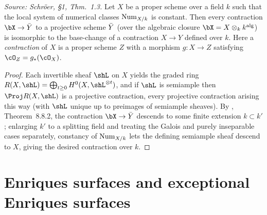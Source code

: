 \begin{theorem}
  \label{thm:projective-contractions}
  \textit{Source: Schr\"oer, §1, Thm.~1.3.}
  Let \(X\) be a proper scheme over a field \(k\) such that the local system of numerical classes
  \(\mathrm{Num}_{X/k}\) is constant. Then every contraction \(\bX \to \bY\) to a projective scheme \(\bar{Y}\)
  (over the algebraic closure \(\bX = X \otimes_k k^{\mathrm{alg}}\)) is isomorphic to the base-change of a
  contraction \(X \to Y\) defined over \(k\). Here a \emph{contraction} of \(X\) is a proper scheme \(Z\) with a
  morphism \(g : X \to Z\) satisfying \(\cO_Z = g_*(\cO_X)\).
\end{theorem}
\begin{proof}
  Each invertible sheaf \(\shL\) on \(X\) yields the graded ring \(R(X, \shL) = \bigoplus_{t \geq 0} H^0(X, \shL^{\otimes t})\),
  and if \(\shL\) is semiample then \(\Proj R(X, \shL)\) is a projective contraction, every projective contraction
  arising this way (with \(\shL\) unique up to preimages of semiample sheaves). By \cite{EGA IVc}, Theorem~8.8.2,
  the contraction \(\bX \to \bY\) descends to some finite extension \(k \subset k'\); enlarging \(k'\) to a splitting
  field and treating the Galois and purely inseparable cases separately, constancy of \(\mathrm{Num}_{X/k}\) lets the defining
  semiample sheaf descend to \(X\), giving the desired contraction over \(k\).
\end{proof}

\section{Enriques surfaces and exceptional Enriques surfaces}

